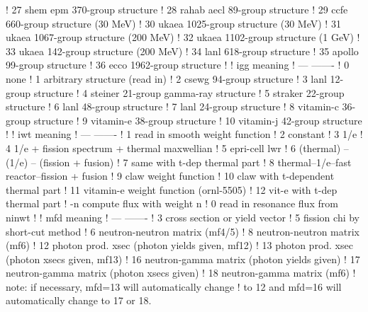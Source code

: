 \begin{ccode}
   !     27           shem epm 370-group structure
   !     28           rahab aecl 89-group structure
   !     29           ccfe   660-group structure  (30 MeV)
   !     30           ukaea 1025-group structure  (30 MeV)
   !     31           ukaea 1067-group structure (200 MeV)
   !     32           ukaea 1102-group structure   (1 GeV)
   !     33           ukaea  142-group structure (200 MeV)
   !     34           lanl 618-group structure
   !     35           apollo 99-group structure
   !     36           ecco 1962-group structure
   !
   !     igg          meaning
   !     ---          -------
   !      0           none
   !      1           arbitrary structure (read in)
   !      2           csewg 94-group structure
   !      3           lanl 12-group structure
   !      4           steiner 21-group gamma-ray structure
   !      5           straker 22-group structure
   !      6           lanl 48-group structure
   !      7           lanl 24-group structure
   !      8           vitamin-c 36-group structure
   !      9           vitamin-e 38-group structure
   !     10           vitamin-j 42-group structure
   !
   !     iwt          meaning
   !     ---          -------
   !      1           read in smooth weight function
   !      2           constant
   !      3           1/e
   !      4           1/e + fission spectrum + thermal maxwellian
   !      5           epri-cell lwr
   !      6           (thermal) -- (1/e) -- (fission + fusion)
   !      7           same with t-dep thermal part
   !      8           thermal--1/e--fast reactor--fission + fusion
   !      9           claw weight function
   !     10           claw with t-dependent thermal part
   !     11           vitamin-e weight function (ornl-5505)
   !     12           vit-e with t-dep thermal part
   !     -n           compute flux with weight n
   !      0           read in resonance flux from ninwt
   !
   !     mfd          meaning
   !     ---          -------
   !      3           cross section or yield vector
   !      5           fission chi by short-cut method
   !      6           neutron-neutron matrix (mf4/5)
   !      8           neutron-neutron matrix (mf6)
   !     12           photon prod. xsec (photon yields given, mf12)
   !     13           photon prod. xsec (photon xsecs given, mf13)
   !     16           neutron-gamma matrix (photon yields given)
   !     17           neutron-gamma matrix (photon xsecs given)
   !     18           neutron-gamma matrix (mf6)
   !         note: if necessary, mfd=13 will automatically change
   !         to 12 and mfd=16 will automatically change to 17 or 18.

\end{ccode}
